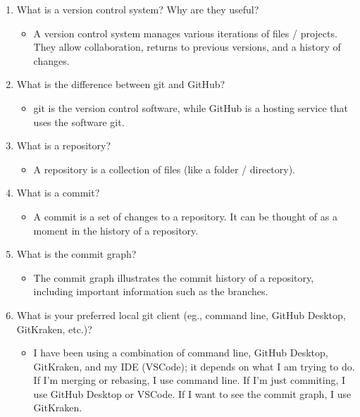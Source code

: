 \documentclass[10pt,twocolumn]{article}
\begin{document}
\begin{enumerate}
    \item What is a version control system? Why are they useful?
        \begin{itemize}
            \item A version control system manages various iterations of files / projects. They allow collaboration, returns to previous versions, and a history of changes.
        \end{itemize}
    \item What is the difference between git and GitHub?
        \begin{itemize}
            \item git is the version control software, while GitHub is a hosting service that uses the software git.
        \end{itemize}
    \item What is a repository?
        \begin{itemize}
            \item A repository is a collection of files (like a folder / directory).
        \end{itemize}
    \item What is a commit?
        \begin{itemize}
            \item A commit is a set of changes to a repository. It can be thought of as a moment in the history of a repository.
        \end{itemize}
    \item What is the commit graph?
        \begin{itemize}
            \item The commit graph illustrates the commit history of a repository, including important information such as the branches.
        \end{itemize}
    \item What is your preferred local git client (eg., command line, GitHub Desktop, GitKraken, etc.)?
        \begin{itemize}
            \item I have been using a combination of command line, GitHub Desktop, GitKraken, and my IDE (VSCode); it depends on what I am trying to do. If I'm merging or rebasing, I use command line. If I'm just commiting, I use GitHub Desktop or VSCode. If I want to see the commit graph, I use GitKraken.
        \end{itemize}
\end{enumerate}
\end{document}
